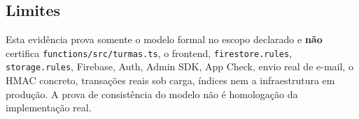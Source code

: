 \begingroup\small\raggedright


\par\endgroup

\subsection*{Limites}
Esta evidência prova somente o modelo formal no escopo declarado e \textbf{não}
certifica \texttt{functions/}\allowbreak\texttt{src/}\allowbreak\texttt{turmas.ts}, o frontend, \texttt{firestore.rules},
\texttt{storage.rules}, Firebase, Auth, Admin SDK, App Check, envio real de
e-mail, o HMAC concreto, transações reais sob carga, índices nem a
infraestrutura em produção. A prova de consistência do modelo não é homologação
da implementação real.
\fussy

